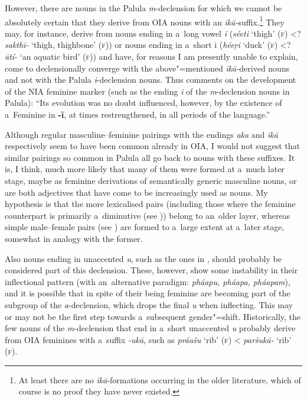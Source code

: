 However, there are nouns in the Palula \textit{m}-declension for which we cannot be absolutely
certain that they derive from OIA nouns with an \textit{ikā-}suffix.\footnote{At least there are
  no \textit{ikā}-formations occurring in the older literature, which of course is no proof
  they have never existed.} They may, for instance, derive from nouns ending in a~long vowel
\textit{ī} (\textit{séeti} `thigh' (\textsc{f}) {\textless}? \textit{sakthī-} `thigh, thighbone' (\textsc{f})) or nouns ending in a~short i (\textit{héeṛi} `duck'
(\textsc{f}) {\textless}? \textit{ātí-} `an aquatic bird' (\textsc{f})) and have, for
reasons I am presently unable to explain, come to declensionally converge with the above"=mentioned
\textit{ikā-}derived nouns and not with the Palula \textit{i}-declension nouns. Thus
\citet[222]{masica1991} comments on the development of the NIA feminine marker (such as the ending
\textit{i} of the \textit{m}-declension nouns in Palula): ``Its evolution was no doubt influenced,
however, by the existence of a~Feminine in \textbf{-ī}, at times
restrengthened, in all periods of the language.''


Although regular masculine--feminine pairings with the endings \textit{aka} and \textit{ikā}
respectively seem to have been common already in OIA, I would not suggest that similar pairings so
common in Palula all go back to nouns with these suffixes. It is, I think, much more likely that
many of them were formed at a~much later stage, maybe as feminine derivations of semantically
generic masculine nouns, or are both adjectives that have come to be increasingly used as nouns. My
hypothesis is that the more lexicalised pairs (including those where the feminine counterpart is
primarily a~diminutive (see )) belong to an~older layer, whereas simple
male--female pairs (see ) are formed to a~large extent at a~later stage, somewhat in
analogy with the former.


Also nouns ending in unaccented \textit{u}, such as the ones in , should probably be considered part of this declension. These, however, show some instability in their inflectional pattern (with an~alternative paradigm: \textit{pháapu, pháapa, pháapam}), and it is possible that in spite of their being feminine are becoming part of the subgroup of the \textit{a}-declension, which drops the final \textit{u} when inflecting. This may or may not be the first step towards a~subsequent gender"=shift. Historically, the few nouns of the \textit{m}-declension that end in a~short unaccented \textit{u} probably derive from OIA feminines with a~suffix \textit{-ukā}, such as \textit{práašu} `rib' (\textsc{f}) {\textless} \textit{paršukā-} `rib' (\textsc{f}).


